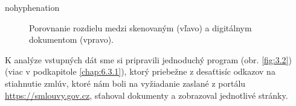 \begin{hyphenrules}{nohyphenation}
\begin{figure}[H]
\begin{minipage}[b]{.35\linewidth}
\end{minipage}
\caption{Porovnanie rozdielu medzi skenovaným (vľavo) a digitálnym dokumentom (vpravo).}
\label{fig:3.1} 
\end{figure}

K analýze vstupných dát sme si pripravili jednoduchý program (obr. \ref{fig:3.2}) (viac v podkapitole \ref{chap:6.3.1}), ktorý priebežne z desaťtisíc odkazov na stiahnutie zmlúv, ktoré nám boli na vyžiadanie zaslané z portálu \url{https://smlouvy.gov.cz}\cite{smlouvy-gov}, sťahoval dokumenty a zobrazoval jednotlivé stránky. 


\end{hyphenrules}
